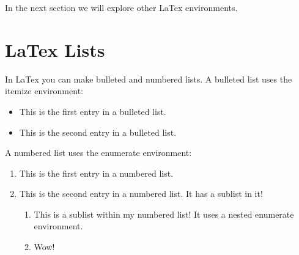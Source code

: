 \documentclass[11pt]{article}
\begin{document}
In the next section we will explore other LaTex environments.

\section{LaTex Lists}
In LaTex you can make bulleted and numbered lists. A bulleted list uses the itemize environment:
\begin{itemize}
    \item This is the first entry in a bulleted list.
    \item This is the second entry in a bulleted list.
\end{itemize}
A numbered list uses the enumerate environment:
\begin{enumerate}
    \item This is the first entry in a numbered list.
    \item This is the second entry in a numbered list. It has a sublist in it!
    \begin{enumerate}
        \item This is a sublist within my numbered list! It uses a nested enumerate environment.
        \item Wow!
    \end{enumerate}
\end{enumerate}
\end{document}
